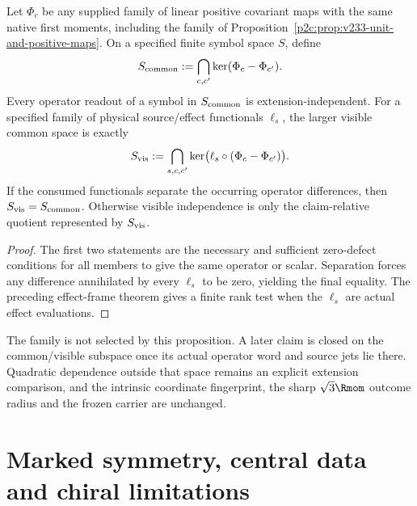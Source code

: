 \documentclass[12pt,a4paper]{article}
\begin{document}
\begin{proposition}
\label{p2c:prop:v2210-lit-extension-quotient}
Let $\Phi_c$ be any supplied family of linear positive covariant maps
with the same native first moments, including the family of
Proposition~\ref{p2c:prop:v233-unit-and-positive-maps}.  On a specified
finite symbol space $S$, define
\[
 S_{\rm common}:=
 \bigcap_{c,c'}\ker(\Phi_c-\Phi_{c'}).
\]
Every operator readout of a symbol in $S_{\rm common}$ is
extension-independent.  For a specified family of physical source/effect
functionals $\ell_s$, the larger visible common space is exactly
\[
 S_{\rm vis}:=
 \bigcap_{s,c,c'}\ker\bigl(\ell_s\circ(\Phi_c-\Phi_{c'})\bigr).
\]
If the consumed functionals separate the occurring operator differences,
then $S_{\rm vis}=S_{\rm common}$.  Otherwise visible independence is
only the claim-relative quotient represented by $S_{\rm vis}$.
\end{proposition}
\begin{proof}
The first two statements are the necessary and sufficient zero-defect
conditions for all members to give the same operator or scalar.  Separation
forces any difference annihilated by every $\ell_s$ to be zero, yielding
the final equality.  The preceding effect-frame theorem gives a finite
rank test when the $\ell_s$ are actual effect evaluations.
\end{proof}
The family is not selected by this proposition.  A later claim is closed
on the common/visible subspace once its actual operator word and source
jets lie there.  Quadratic dependence outside that space remains an
explicit extension comparison, and the intrinsic coordinate fingerprint,
the sharp $\sqrt3\Rmom$ outcome radius and the frozen carrier are unchanged.


\section{Marked symmetry, central data and chiral limitations}
\label{paper2c:sec:organized-boundaries}
\end{document}
